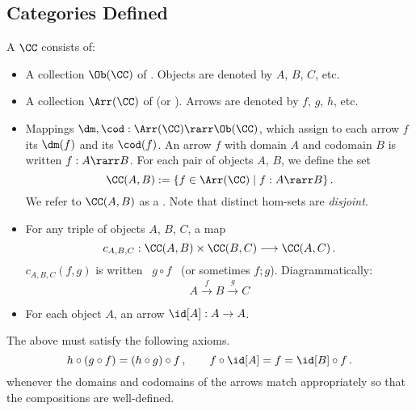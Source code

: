 \documentclass{svmult}
\begin{document}
%


\subsection{Categories Defined}
\begin{mydefinition}
A  $\CC$ consists of:
\begin{itemize}
  \item A collection $\Ob(\CC)$ of . Objects are denoted by $A$, $B$, $C$, etc.
  \item A collection $\Arr(\CC)$ of  (or ). Arrows are denoted by $f$, $g$, $h$, etc.
  \item Mappings $\dm, \cod : \Arr(\CC) \rarr \Ob(\CC)$, which assign to each arrow $f$ its  $\dm(f)$ and its  $\cod(f)$. An arrow $f$ with domain $A$ and codomain $B$  is written
  $f:A\rarr B$.  For each pair of objects $A$, $B$, we define the  set
  \[ \CC(A,B) := \{ f \in \Arr(\CC) \mid f : A \rarr B \} \, . \]
  We refer to $\CC(A, B)$ as a . Note that distinct hom-sets are \emph{disjoint}.
    \item For any triple of objects $A$, $B$, $C$, a  map
    \[ c_{A,B,C} : \CC (A, B) \times \CC (B, C) \longrightarrow \CC (A, C)\,. \]
  $c_{A, B, C}(f, g)$ is written \ $g\circ\!f$ \ (or sometimes $f ; g$). Diagrammatically:
  \[ A \stackrel{f}{\longrightarrow} B \stackrel{g}{\longrightarrow} C \]
  \item For each object $A$, an  arrow $\id[A]:A\rightarrow A$.
\end{itemize}
The above must satisfy the following axioms.
\[ h \circ (g \circ f) = (h \circ g) \circ f \,,\qquad f \circ \id[A] = f = \id[B] \circ f\,. \]
whenever the domains and codomains of the arrows match appropriately so that the compositions are well-defined. \deq
\end{mydefinition}
\end{document}
